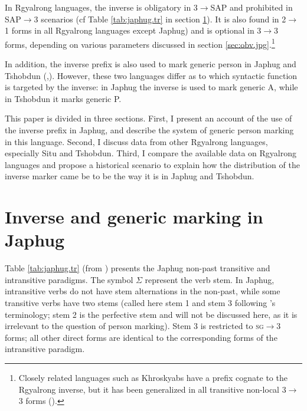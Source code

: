 \documentclass[oldfontcommands,oneside,a4paper,11pt]{article}
\newcommand{\ro}{$\Sigma$}
\begin{document}
In Rgyalrong languages, the inverse is obligatory in 3$\rightarrow$SAP and prohibited in SAP$\rightarrow$3 scenarios (cf Table \ref{tab:japhug.tr} in section \ref{sec:japhug}). It is also found in  2$\rightarrow$1 forms in all Rgyalrong languages except Japhug) and is optional in 3$\rightarrow$3 forms, depending on various parameters discussed  in section \ref{sec:obv.jpg}.\footnote{Closely related languages such as Khroskyabs have a prefix cognate to the Rgyalrong inverse, but it has been generalized in all transitive non-local 3$\rightarrow$3 forms (\citealt{lai13affixale}).}

In addition, the inverse prefix is also used to mark generic person in Japhug and Tshobdun  (\citealt{jacques12demotion},\citealt{sun14generic}). However, these two languages differ as to which syntactic function is targeted by the inverse: in Japhug the inverse is used to mark generic A, while in Tshobdun it marks generic P. 

  This paper is divided in three sections. First, I present an account of the use of the inverse prefix in Japhug, and describe the system of generic person marking in this language. Second, I  discuss data from other Rgyalrong languages, especially Situ and Tshobdun. Third, I compare the available data on Rgyalrong languages and propose   a historical scenario to explain how the distribution of the inverse marker came be to be the way it is in Japhug and Tshobdun.
 
 
\section{Inverse and generic marking in Japhug} \label{sec:japhug}
Table \ref{tab:japhug.tr} (from  \citealt{jacques10inverse}) presents the Japhug non-past transitive and intransitive paradigms. The symbol \ro{} represent the verb stem. In Japhug, intransitive verbs do not have stem alternations in the non-past, while some transitive verbs have two stems (called here stem 1 and stem 3 following \citealt{jackson00sidaba}'s terminology; stem 2 is the perfective stem and will not be discussed here, as it is irrelevant to the question of person marking). Stem 3 is restricted to \textsc{sg}$\rightarrow$3 forms; all other direct forms are identical to the corresponding forms of the intransitive paradigm.
\end{document}
